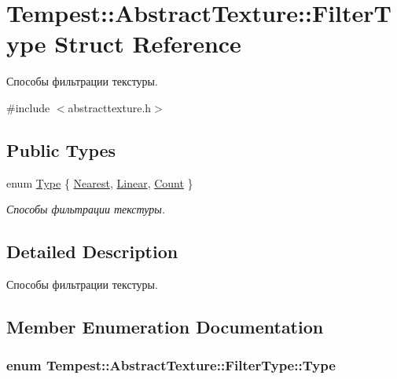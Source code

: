 \hypertarget{struct_tempest_1_1_abstract_texture_1_1_filter_type}{\section{Tempest\+:\+:Abstract\+Texture\+:\+:Filter\+Type Struct Reference}
\label{struct_tempest_1_1_abstract_texture_1_1_filter_type}
}


Способы фильтрации текстуры.  




{\ttfamily \#include $<$abstracttexture.\+h$>$}

\subsection*{Public Types}
\begin{DoxyCompactItemize}
\item 
enum \hyperlink{struct_tempest_1_1_abstract_texture_1_1_filter_type_aa28dcbdc63244fe43cfb7258f6996978}{Type} \{ \hyperlink{struct_tempest_1_1_abstract_texture_1_1_filter_type_aa28dcbdc63244fe43cfb7258f6996978a484d5ec433c09e3e650a5edbb354df06}{Nearest}, 
\hyperlink{struct_tempest_1_1_abstract_texture_1_1_filter_type_aa28dcbdc63244fe43cfb7258f6996978a045ff1a08bf815cbf4a46e9da4a8c506}{Linear}, 
\hyperlink{struct_tempest_1_1_abstract_texture_1_1_filter_type_aa28dcbdc63244fe43cfb7258f6996978a9d8f7121f7130f9bc78c4017e8c6962f}{Count}
 \}
\begin{DoxyCompactList}\small\item\em Способы фильтрации текстуры. \end{DoxyCompactList}\end{DoxyCompactItemize}


\subsection{Detailed Description}
Способы фильтрации текстуры. 

\subsection{Member Enumeration Documentation}
\hypertarget{struct_tempest_1_1_abstract_texture_1_1_filter_type_aa28dcbdc63244fe43cfb7258f6996978}{
\subsubsection[{Type}]{\setlength{\rightskip}{0pt plus 5cm}enum {\bf Tempest\+::\+Abstract\+Texture\+::\+Filter\+Type\+::\+Type}}}\label{struct_tempest_1_1_abstract_texture_1_1_filter_type_aa28dcbdc63244fe43cfb7258f6996978}


